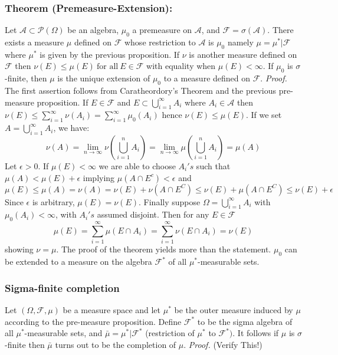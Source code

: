\documentclass{article}
\begin{document}
\subsubsection{Theorem (Premeasure-Extension):}
Let $\mathcal{A}\subset\mathcal{P}(\Omega)$ be an algebra, $\mu_0$ a premeasure on $\mathcal{A}$, and $\mathcal{F}=\sigma(\mathcal{A})$. There exists a measure $\mu$ defined on $\mathcal{F}$ whose restriction to $\mathcal{A}$ is $\mu_0$ namely $\mu= \mu^*|\mathcal{F}$ where $\mu^*$ is given by the previous proposition. If $\nu$ is another measure defined on $\mathcal{F}$ then $\nu(E)\leq \mu(E) \ \text{for all} \ E \in \mathcal{F}$ with equality when $\mu(E) < \infty$. If $\mu_0$ is $\sigma$-finite, then $\mu$ is the unique extension of $\mu_0$ to a measure defined on $\mathcal{F}$.\newline \newline
\textit{Proof.}\newline \newline
The first assertion follows from Caratheordory's Theorem and the previous pre-measure proposition. If $E \in \mathcal{F}$ and $E \subset \bigcup_{i=1}^{\infty}A_i$ where $A_i \in \mathcal{A}$ then $\nu(E) \leq \sum_{i=1}^{\infty}\nu(A_i)=\sum_{i=1}^{\infty}\mu_0(A_i)$ hence $\nu(E)\leq \mu(E)$. If we set $A=\bigcup_{i=1}^{\infty}A_i$, we have:
\[
\nu(A) = \lim_{n\to\infty}\nu(\bigcup_{i=1}^nA_i) = \lim_{n\to\infty}\mu(\bigcup_{i=1}^nA_i) = \mu(A)
\]
Let $\epsilon>0$. If $\mu(E) < \infty$ we are able to choose $A_i's$ such that $\mu(A) < \mu(E) + \epsilon$ implying  $\mu(A \cap E^c)< \epsilon$ and 
\[
\mu(E) \leq \mu(A) = \nu(A)=\nu(E) + \nu(A\cap E^C) \leq \nu(E) + \mu(A\cap E^C) \leq \nu(E) + \epsilon
\]
Since $\epsilon$ is arbitrary, $\mu(E)=\nu(E)$. Finally suppose $\Omega =\bigcup_{i=1}^{\infty}A_i$ with $\mu_0(A_i)<\infty$, with $A_i's$ assumed disjoint. Then for any $E \in \mathcal{F}$
\[
\mu(E)=\sum_{i=1}^{\infty}\mu(E\cap A_i) = \sum_{i=1}^{\infty}\nu(E\cap A_i)=\nu(E)
\]
showing $\nu=\mu$.\newline \newline
The proof of the theorem yields more than the statement. $\mu_0$ can be extended to a measure on the algebra $\mathcal{F}^*$ of all $\mu^*$-measurable sets. 
\subsubsection{Sigma-finite completion}
Let $(\Omega, \mathcal{F},\mu)$ be a measure space and let $\mu^*$ be the outer measure induced by $\mu$ according to the pre-measure proposition. Define $\mathcal{F^*}$ to be the sigma algebra of all $\mu^*$-measurable sets, and $\bar{\mu}= \mu^*|\mathcal{F^*}$ (restriction of $\mu^*$ to $\mathcal{F^*})$. It follows if $\mu$ is $\sigma$-finite then $\bar{\mu}$ turns out to be the completion of $\mu$. \newline \newline
\textit{Proof.} \newline \newline
(Verify This!)
\end{document}
